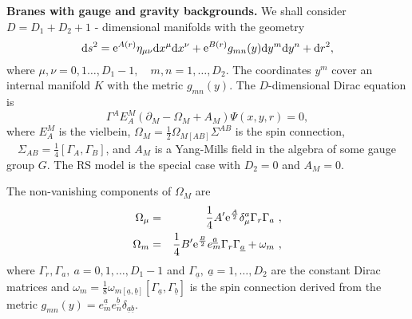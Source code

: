 \documentclass[a4paper,12pt]{article}
\newcommand{\un}{\underline}
\begin{document}
{\bf Branes with gauge and gravity backgrounds.} We shall consider 
$D = D_1+D_2+1$ - dimensional manifolds with the geometry
\begin{equation}
\label{eq2}
{\rm d}s^2={\rm e}^{A(r)}\eta_{\mu\nu}{\rm d}x^\mu{\rm d}x^\nu
+{\rm e}^{B(r)}g_{mn}(y){\rm d}y^m{\rm d}y^n+{\rm d}r^2,
\end{equation}
where $\mu,\nu=0,1\dots,D_1-1, \quad m,n=1,\dots,D_2$. The coordinates $y^m$ 
cover an internal manifold $K$ with the metric $g_{mn}(y)$. The 
$D$-dimensional Dirac equation is
\begin{equation}\label{eq3}
\Gamma^A E_A^M(\partial_M-\Omega_M+A_M)\Psi(x,y,r)=0,
\end{equation}
where $E_A^M$ is the vielbein, $\Omega_M= \frac{1}{2}
\Omega_{M[AB]}\Sigma^{AB}$ is the spin connection,$\quad
\Sigma_{AB}=\frac{1}{4}[\Gamma_A,\Gamma_B]$, and $A_M$ is a
Yang-Mills field in the algebra of some  gauge group $G$. The RS
model is the special case with $D_2=0$ and $A_M=0$.

The  non-vanishing components of $\Omega_M$ are
\begin{eqnarray}
\Omega_\mu&=& \frac{1}{4}A'{\rm e}^{A\over 
2}\delta_\mu^a\Gamma_r\Gamma_a\label{eq4}~,\\
\Omega_m&=& \frac{1}{4}B'{\rm e}^{\frac{B}{2}}e_m^{\un{a}}
\Gamma_r\Gamma_{\un{a}}+\omega_m ~,
\label{eq5}
\end{eqnarray}
where $\Gamma_r,\Gamma_a,~a=0,1,\dots,D_1-1$ and
$\Gamma_{\un{a}},~\un{a}=1,\dots,D_2$  are the constant Dirac
matrices and $\omega_m=\frac{1}{8}
\omega_{m[\un{a},\un{b}]}[\Gamma_{\un{a}},\Gamma_{\un{b}}]$ is the
spin  connection derived from the metric
$g_{mn}(y)=e_m^{\un{a}}e_n^{\un{b}}\delta_{\un{a}\un{b}}$.
\end{document}
